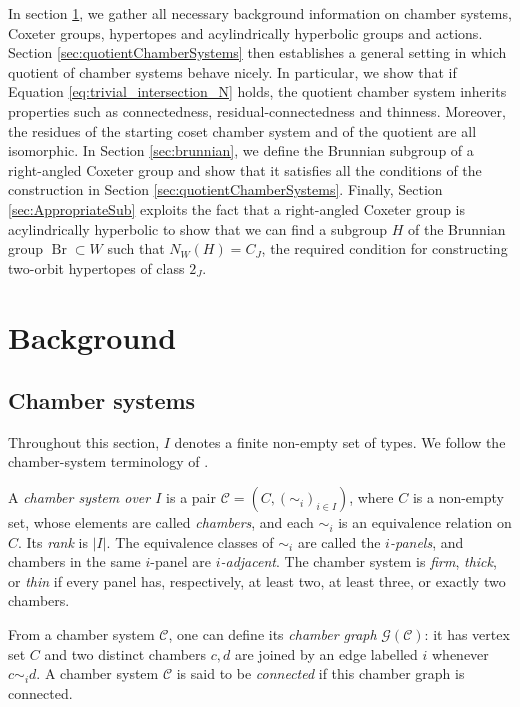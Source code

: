 \documentclass[11pt,letterpaper]{amsart}
\newcommand{\GG}{\mathcal{G}}
\newcommand{\CC}{\mathcal{C}}
\newcommand{\C}{\mathcal{C}}
\newcommand{\Br}{\operatorname{Br}}
\begin{document}
In section \ref{sec:background}, we gather all necessary background information on chamber systems, Coxeter groups, hypertopes and acylindrically hyperbolic groups and actions. Section \ref{sec:quotientChamberSystems} then establishes a general setting in which quotient of chamber systems behave nicely. In particular, we show that if Equation \eqref{eq:trivial_intersection_N} holds, the quotient chamber system inherits properties such as connectedness, residual-connectedness and thinness. Moreover, the residues of the starting coset chamber system and of the quotient are all isomorphic. In Section \ref{sec:brunnian}, we define the Brunnian subgroup of a right-angled Coxeter group and show that it satisfies all the conditions of the construction in Section \ref{sec:quotientChamberSystems}. Finally, Section \ref{sec:AppropriateSub} exploits the fact that a right-angled Coxeter group is acylindrically hyperbolic to show that we can find a subgroup $H$ of the Brunnian group $\Br \subset W$ such that $N_W(H) = C_J$, the required condition for constructing two-orbit hypertopes of class $2_J$.

\section{Background}\label{sec:background}

\subsection{Chamber systems}\label{sec:ChamberSystems}

Throughout this section, $I$ denotes a finite non-empty set of types.  We
follow the chamber-system terminology of
\cite[Chapter~3]{buekenhout2013diagram}.


A \emph{chamber system over $I$} is a pair $\CC=(C,(\sim_i)_{i\in I})$,
where $C$ is a non-empty set, whose elements are called \emph{chambers}, and
each $\sim_i$ is an equivalence relation on $C$.  Its \emph{rank} is $|I|$.
The equivalence classes of $\sim_i$ are called the \emph{$i$-panels}, and
chambers in the same $i$-panel are \emph{$i$-adjacent}.  The chamber system
is \emph{firm}, \emph{thick}, or \emph{thin} if every panel has, respectively,
at least two, at least three, or exactly two chambers.

From a chamber system $\C$, one can define its \emph{chamber graph} $\GG(\CC)$: it has vertex set $C$ and two distinct chambers
$c,d$ are joined by an edge labelled $i$ whenever $c\sim_i d$.  A chamber
system $\C$ is said to be \emph{connected} if this chamber graph is connected.
\end{document}
